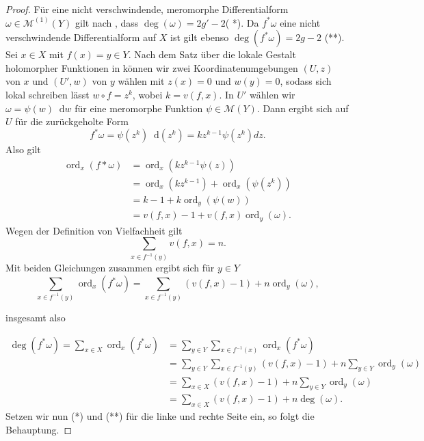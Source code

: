 \documentclass[11pt,a4paper,toc=bibliography]{scrartcl}
\theoremstyle{def}
\theoremstyle{thm}
\theoremstyle{remark}
\DeclareMathOperator{\ord}{ord}
\newcommand*\dif{\mathop{}\!\mathrm{d}}\newcommand{\einschraenkung}{\,\rule[-5pt]{0.4pt}{12pt}\,{}} %
\begin{document}
\begin{proof}
Für eine nicht verschwindende, meromorphe Differentialform $\omega\in \mathcal{M}^{(1)}(Y)$ gilt nach , dass
 $\deg(\omega)=2g'-2$( *). Da $f^*\omega$ eine nicht verschwindende Differentialform auf $X$ ist gilt ebenso $\deg (f^*\omega)=2g-2$ (**). Sei $x\in X$ mit $f(x)=y\in Y$. 
 Nach dem Satz über die lokale Gestalt holomorpher Funktionen in \cite[~S.9]{forster} können wir zwei Koordinatenumgebungen $(U,z)$ von $x$ und $(U',w)$ von $y$ wählen mit $z(x)=0$ und $w(y)=0$, sodass sich lokal schreiben lässt $w\circ f=z^k$, wobei $k=v(f,x)$. In $U'$ wählen wir $\omega = \psi (w) \dif w$ für eine meromorphe Funktion $\psi\in \mathcal{M}(Y)$. Dann ergibt sich auf $U$ für die zurückgeholte Form 
\[
f^*\omega = \psi(z^k)\dif (z^k) = kz^{k-1}\psi(z^k)dz.
\]    	
Also gilt 
\begin{align*}
	{\ord_x} (f*\omega) 	&= \ord_x(kz^{k-1}\psi(z))\\
					  	&= \ord_x(kz^{k-1})+\ord_x(\psi(z^k))\\
					  	&= k-1 +k\ord_y(\psi(w))\\
					  	&= v(f,x)-1+v(f,x) \ord_y(\omega).
\end{align*}
Wegen der Definition von Vielfachheit gilt 
\[
\sum_{x\in f^{-1}(y)} v(f,x) = n.
\]
Mit beiden Gleichungen zusammen ergibt sich für $y\in Y$ 
\[
\sum_{x\in f^{-1}(y)} \ord_x(f^*\omega)= \sum_{x\in f^{-1}(y)}\left( v(f,x)-1 \right) +n \ord_y(\omega),
\]

insgesamt also

\begin{align*}
	\deg(f^*\omega)=\sum_{x\in X} \textstyle{\ord_x}(f^*\omega) &= \sum_{y\in Y}\sum_{x\in f^{-1}(x)} \textstyle{\ord_x}(f^*\omega)\\
	&=\sum_{y\in Y}\sum_{x\in f^{-1}(y)}(v(f,x)-1)+ n\sum_{y\in Y}\textstyle{\ord_y}(\omega) \\
	&=\sum_{x\in X} (v(f,x)-1) + n\sum_{y\in Y} \ord_y(\omega)\\
	&=\sum_{x\in X} (v(f,x)-1) + n\deg (\omega).
	\end{align*}
	Setzen wir nun (*) und (**) für die linke und rechte Seite ein, so folgt die Behauptung. 
\end{proof}

\end{document}
